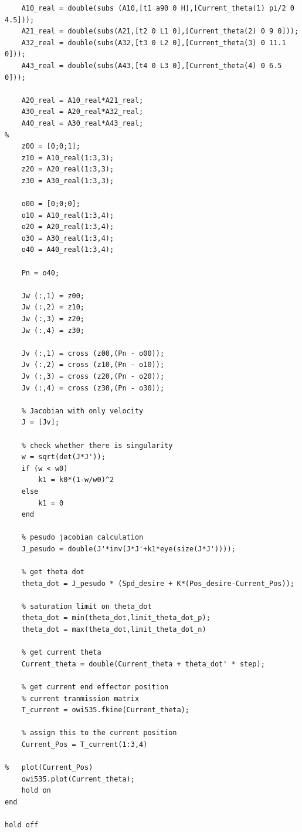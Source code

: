 \documentclass[paper=letter, fontsize=10pt]{scrartcl}	%
\numberwithin{equation}{section}															%
\numberwithin{figure}{section}																%
\numberwithin{table}{section}																%
\begin{document}
\begin{lstlisting}
    A10_real = double(subs (A10,[t1 a90 0 H],[Current_theta(1) pi/2 0 4.5]));
    A21_real = double(subs(A21,[t2 0 L1 0],[Current_theta(2) 0 9 0]));
    A32_real = double(subs(A32,[t3 0 L2 0],[Current_theta(3) 0 11.1 0]));
    A43_real = double(subs(A43,[t4 0 L3 0],[Current_theta(4) 0 6.5 0]));
    
    A20_real = A10_real*A21_real;
    A30_real = A20_real*A32_real;
    A40_real = A30_real*A43_real;
%     
    z00 = [0;0;1];
    z10 = A10_real(1:3,3);
    z20 = A20_real(1:3,3);
    z30 = A30_real(1:3,3);
    
    o00 = [0;0;0];
    o10 = A10_real(1:3,4);
    o20 = A20_real(1:3,4);
    o30 = A30_real(1:3,4);
    o40 = A40_real(1:3,4);
   
    Pn = o40;
    
    Jw (:,1) = z00;
    Jw (:,2) = z10;
    Jw (:,3) = z20;
    Jw (:,4) = z30;
    
    Jv (:,1) = cross (z00,(Pn - o00));
    Jv (:,2) = cross (z10,(Pn - o10));
    Jv (:,3) = cross (z20,(Pn - o20));
    Jv (:,4) = cross (z30,(Pn - o30));
    
    % Jacobian with only velocity
    J = [Jv];
    
    % check whether there is singularity
    w = sqrt(det(J*J'));
    if (w < w0)
        k1 = k0*(1-w/w0)^2
    else
        k1 = 0
    end

    % pesudo jacobian calculation
    J_pesudo = double(J'*inv(J*J'+k1*eye(size(J*J'))));

    % get theta dot
    theta_dot = J_pesudo * (Spd_desire + K*(Pos_desire-Current_Pos));
    
    % saturation limit on theta_dot
    theta_dot = min(theta_dot,limit_theta_dot_p);
    theta_dot = max(theta_dot,limit_theta_dot_n)
    
    % get current theta 
    Current_theta = double(Current_theta + theta_dot' * step);
    
    % get current end effector position
    % current tranmission matrix
    T_current = owi535.fkine(Current_theta);
    
    % assign this to the current position
    Current_Pos = T_current(1:3,4)
    
%   plot(Current_Pos)
    owi535.plot(Current_theta);
    hold on
end

hold off
\end{lstlisting}
\end{document}
